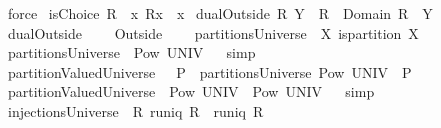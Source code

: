 \begin{isabellebody}
\ force\isanewline
{}\isamarkupfalse%
%
\endisatagproof
{\isafoldproof}%
%
\isadelimproof
%
\endisadelimproof
%
\isamarkuptrue%
\isamarkupfalse%
\ {\isachardoublequoteopen}isChoice\ R\ {\isacharequal}{\isacharequal}\ {\isasymforall}x{\isachardot}\ R{\isacharbackquote}{\isacharbackquote}{\isacharbraceleft}x{\isacharbraceright}\ {\isasymsubseteq}\ x{\isachardoublequoteclose}\isanewline
{}\isamarkupfalse%
\ {\isachardoublequoteopen}dualOutside\ R\ Y\ {\isacharequal}{\isacharequal}\ R\ {\isacharminus}\ {\isacharparenleft}Domain\ R\ {\isasymtimes}\ Y{\isacharparenright}{\isachardoublequoteclose}\isanewline
{}\isamarkupfalse%
\ dualOutside\ {\isacharparenleft}\ {\isachardoublequoteopen}{\isacharbar}{\isacharminus}{\isachardoublequoteclose}\ {}{}{\isacharparenright}\isanewline
{}\isamarkupfalse%
\ Outside\ {\isacharparenleft}\ {\isachardoublequoteopen}{\isacharminus}{\isacharbar}{\isachardoublequoteclose}\ {}{}{\isacharparenright}\isanewline
\isanewline
{}\isamarkupfalse%
\ {\isachardoublequoteopen}partitionsUniverse\ {\isacharequal}{\isacharequal}\ {\isacharbraceleft}X{\isachardot}\ is{\isacharunderscore}partition\ X{\isacharbraceright}{\isachardoublequoteclose}\isanewline
{}\isamarkupfalse%
\ {\isachardoublequoteopen}partitionsUniverse\ {\isasymsubseteq}\ Pow\ UNIV{\isachardoublequoteclose}%
\isadelimproof
\ %
\endisadelimproof
%
\isatagproof
{}\isamarkupfalse%
\ simp%
\endisatagproof
{\isafoldproof}%
%
\isadelimproof
%
\endisadelimproof
\ \ \ \ \ \ \ \isanewline
{}\isamarkupfalse%
\ {\isachardoublequoteopen}partitionValuedUniverse\ {\isacharequal}{\isacharequal}\ {\isasymUnion}\ P\ {\isasymin}\ partitionsUniverse{\isachardot}\ Pow\ {\isacharparenleft}UNIV\ {\isasymtimes}\ P{\isacharparenright}{\isachardoublequoteclose}\isanewline
{}\isamarkupfalse%
\ {\isachardoublequoteopen}partitionValuedUniverse\ {\isasymsubseteq}\ Pow\ {\isacharparenleft}UNIV\ {\isasymtimes}\ {\isacharparenleft}Pow\ UNIV{\isacharparenright}{\isacharparenright}{\isachardoublequoteclose}%
\isadelimproof
\ %
\endisadelimproof
%
\isatagproof
{}\isamarkupfalse%
\ simp%
\endisatagproof
{\isafoldproof}%
%
\isadelimproof
%
\endisadelimproof
\isanewline
{}\isamarkupfalse%
\ {\isachardoublequoteopen}injectionsUniverse\ {\isacharequal}{\isacharequal}\ {\isacharbraceleft}R{\isachardot}\ {\isacharparenleft}runiq\ R{\isacharparenright}\ {\isacharampersand}\ {\isacharparenleft}runiq\ {\isacharparenleft}R{\isacharcircum}{\isacharminus}{}{\isacharparenright}{\isacharparenright}{\isacharbraceright}{\isachardoublequoteclose}\isanewline

\end{isabellebody}
